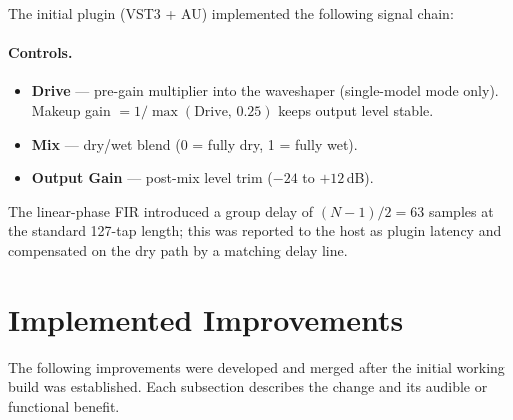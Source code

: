 \documentclass[11pt, letterpaper]{article}
\begin{document}
The initial plugin (VST3 + AU) implemented the following signal chain:

\begin{center}
\end{center}

\paragraph{Controls.}
\begin{itemize}[leftmargin=1.5em]
    \item \textbf{Drive} — pre-gain multiplier into the waveshaper (single-model
          mode only).  Makeup gain $= 1/\max(\mathrm{Drive},\,0.25)$ keeps
          output level stable.
    \item \textbf{Mix} — dry/wet blend (0 = fully dry, 1 = fully wet).
    \item \textbf{Output Gain} — post-mix level trim ($-24$ to $+12$\,dB).
\end{itemize}

The linear-phase FIR introduced a group delay of $(N-1)/2 = 63$ samples at the
standard 127-tap length; this was reported to the host as plugin latency and
compensated on the dry path by a matching delay line.

\section{Implemented Improvements}
\label{sec:implemented}

The following improvements were developed and merged after the initial working
build was established.  Each subsection describes the change and its audible or
functional benefit.

\end{document}
